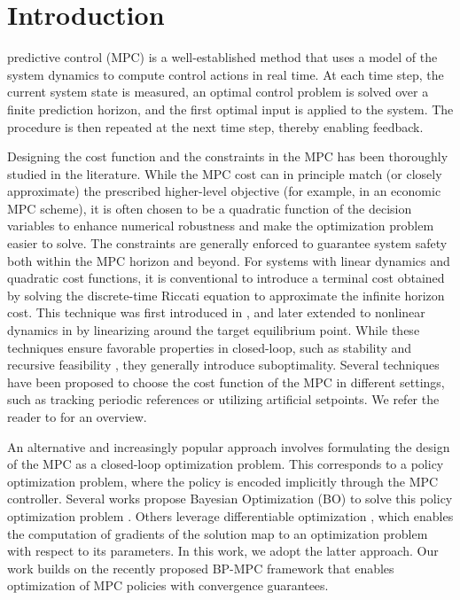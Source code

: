 \documentclass[journal,twoside,web,final]{ieeecolor}
\theoremstyle{definition}
\begin{document}

\section{Introduction}
\label{section:introduction}
 predictive control (MPC) is a well-established method that uses a model of the system dynamics to compute control actions in real time. At each time step, the current system state is measured, an optimal control problem is solved over a finite prediction horizon, and the first optimal input is applied to the system. The procedure is then repeated at the next time step, thereby enabling feedback.

Designing the cost function and the constraints in the MPC has been thoroughly studied in the literature. 
While the MPC cost can in principle match (or closely approximate) the prescribed higher-level objective (for example, in an economic MPC scheme), it is often chosen to be a quadratic function of the decision variables to enhance numerical robustness and make the optimization problem easier to solve.
The constraints are generally enforced to guarantee system safety both within the MPC horizon and beyond. 
For systems with linear dynamics and quadratic cost functions, it is conventional to introduce a terminal cost obtained by solving the discrete-time Riccati equation to approximate the infinite horizon cost. 
This technique was first introduced in \cite{sznaier1987suboptimal}, and later extended to nonlinear dynamics in \cite{chen1998quasi} by linearizing around the target equilibrium point. 
While these techniques ensure favorable properties in closed-loop, such as stability and recursive feasibility \cite{scokaert2002constrained}, they generally introduce suboptimality.
Several techniques have been proposed to choose the cost function of the MPC in different settings, such as tracking periodic references or utilizing artificial setpoints. We refer the reader to \cite{kohler2024analysis} for an overview.

An alternative and increasingly popular approach involves formulating the design of the MPC as a closed-loop optimization problem. This corresponds to a policy optimization problem, where the policy is encoded implicitly through the MPC controller.
Several works propose Bayesian Optimization (BO) to solve this policy optimization problem \cite{edwards2021automatic,sorourifar2021data,puigjaner2025performance}. Others leverage differentiable optimization \cite{amos2017optnet,amos2018differentiable}, which enables the computation of gradients of the solution map to an optimization problem with respect to its parameters. In this work, we adopt the latter approach.
Our work builds on the recently proposed BP-MPC framework \cite{zuliani2023bp,zuliani2024closed} that enables optimization of MPC policies with convergence guarantees.
\end{document}
